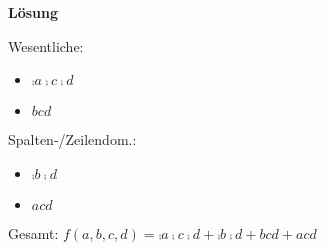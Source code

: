 \documentclass{CInf_practice}
\begin{document}
\textbf{Lösung}

Wesentliche:
\begin{itemize}
	\item $\comp a \comp c \comp d$
  \item $bcd$
\end{itemize}

Spalten-/Zeilendom.:
\begin{itemize}
	\item $\comp b \comp d$
  \item $acd$
\end{itemize}

Gesamt: $f(a,b,c,d) = \comp a \comp c \comp d + \comp b \comp d + bcd + acd$
\end{document}
